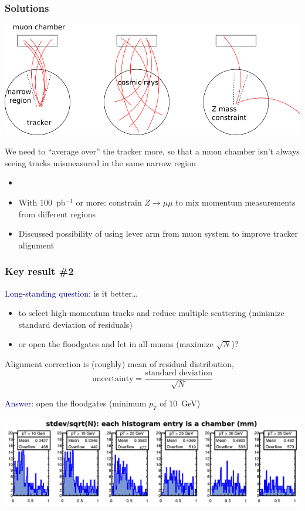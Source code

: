 \documentclass[compress]{beamer}
\begin{document}
\begin{frame}
\frametitle{Solutions}

\begin{center}
\includegraphics[width=0.8\linewidth]{solutions.png}
\end{center}

\vfill
We need to ``average over'' the tracker more, so that a muon chamber isn't always seeing tracks mismeasured in the same narrow region

\begin{itemize}
\item \textcolor{darkblue}{}
\item With 100~pb$^{-1}$ or more: constrain $Z\to\mu\mu$ to mix momentum measurements from different regions
\item Discussed possibility of using lever arm from muon system to improve tracker alignment
\end{itemize}
\end{frame}

\begin{frame}
\frametitle{Key result \#2}
\small

\textcolor{darkblue}{Long-standing question:} is it better\ldots
\begin{itemize}
\item to select high-momentum tracks and reduce multiple scattering (minimize standard deviation of residuals)
\item or open the floodgates and let in all muons (maximize $\sqrt{N}$)?
\end{itemize}

\vfill
Alignment correction is (roughly) mean of residual distribution,
\[ \mbox{uncertainty} = \frac{\mbox{standard deviation}}{\sqrt{N}} \]

\vfill
\textcolor{darkblue}{Answer:} open the floodgates (minimum $p_T$ of 10~GeV)

\vspace{0.1 cm}
\includegraphics[width=\linewidth]{widening.png}
\end{frame}
\end{document}
